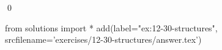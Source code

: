 
\begin{ex}
  \label{ex:12-30-structures}
  
  \qed
\end{ex}
\begin{python0}
from solutions import *
add(label="ex:12-30-structures",
    srcfilename='exercises/12-30-structures/answer.tex')
\end{python0}
